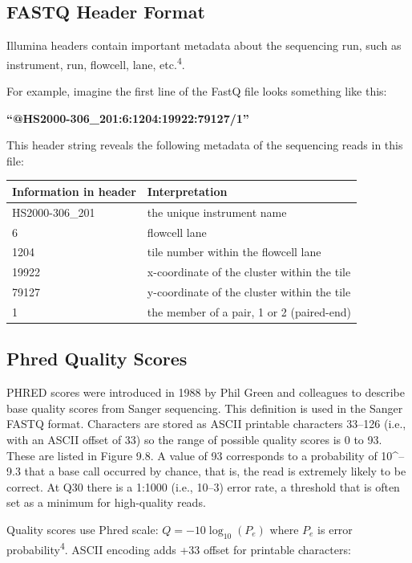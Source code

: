 \documentclass[
  letterpaper,
  DIV=11,
  numbers=noendperiod]{scrreprt}
\begin{document}
\subsection{FASTQ Header Format}\label{fastq-header-format}

Illumina headers contain important metadata about the sequencing run,
such as instrument, run, flowcell, lane, etc.\textsuperscript{4}.

For example, imagine the first line of the FastQ file looks something
like this:

\textbf{``@HS2000-306\_201:6:1204:19922:79127/1''}

This header string reveals the following metadata of the sequencing
reads in this file:

\begin{longtable}[]{@{}ll@{}}
\toprule\noalign{}
Information in header & Interpretation \\
\midrule\noalign{}
\endhead
\bottomrule\noalign{}
\endlastfoot
HS2000-306\_201 & the unique instrument name \\
6 & flowcell lane \\
1204 & tile number within the flowcell lane \\
19922 & x-coordinate of the cluster within the tile \\
79127 & y-coordinate of the cluster within the tile \\
1 & the member of a pair, 1 or 2 (paired-end) \\
\end{longtable}

\subsection{Phred Quality Scores}\label{phred-quality-scores}

PHRED scores were introduced in 1988 by Phil Green and colleagues to
describe base quality scores from Sanger sequencing. This definition is
used in the Sanger FASTQ format. Characters are stored as ASCII
printable characters 33--126 (i.e., with an ASCII offset of 33) so the
range of possible quality scores is 0 to 93. These are listed in Figure
9.8. A value of 93 corresponds to a probability of 10\^{}--9.3 that a
base call occurred by chance, that is, the read is extremely likely to
be correct. At Q30 there is a 1:1000 (i.e., 10--3) error rate, a
threshold that is often set as a minimum for high-quality reads.

Quality scores use Phred scale: \(Q = -10\log_{10}(P_e)\) where \(P_e\)
is error probability\textsuperscript{4}. ASCII encoding adds +33 offset
for printable characters:
\end{document}
